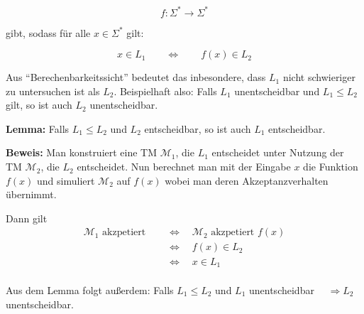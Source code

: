 \documentclass{scrartcl}%
\begin{document}
    \begin{equation*}
        f: \Sigma^* \rightarrow \Sigma^*
    \end{equation*}

    gibt, sodass für alle $x \in \Sigma^*$ gilt:

    \begin{equation*}
        x \in L_1 \qquad \Leftrightarrow \qquad f(x) \in L_2
    \end{equation*}

    Aus "`Berechenbarkeitssicht"' bedeutet das inbesondere, dass $L_1$ nicht schwieriger zu untersuchen ist als $L_2$.
    Beispielhaft also: Falls $L_1$ unentscheidbar und $L_1 \leq L_2$ gilt, so ist auch $L_2$ unentscheidbar.

    \vspace*{0.3cm}
    \textbf{\textsf{Lemma:}} Falls $L_1 \leq L_2$ und $L_2$ entscheidbar, so ist auch $L_1$ entscheidbar.

    \vspace*{0.3cm}
    \textbf{\textsf{Beweis:}} Man konstruiert eine TM $\mathcal{M}_1$,
    die $L_1$ entscheidet unter Nutzung der TM $\mathcal{M}_2$, die $L_2$ entscheidet.
    Nun berechnet man mit der Eingabe $x$ die Funktion $f(x)$ und simuliert $\mathcal{M}_2$ auf $f(x)$ wobei man deren Akzeptanzverhalten übernimmt.

    Dann gilt
    \begin{align*}
        \mathcal{M}_1 \text{ akzpetiert } & \quad \Leftrightarrow \quad \mathcal{M}_2 \text{ akzpetiert } f(x) \\
        & \quad \Leftrightarrow \quad f(x) \in L_2 \\
        & \quad \Leftrightarrow \quad x \in L_1 \\
    \end{align*}\proofend

    \vspace*{0.3cm}
    Aus dem Lemma folgt außerdem: Falls $L_1 \leq L_2$ und $L_1$ unentscheidbar $\quad \Rightarrow L_2$ unentscheidbar.
\end{document}
